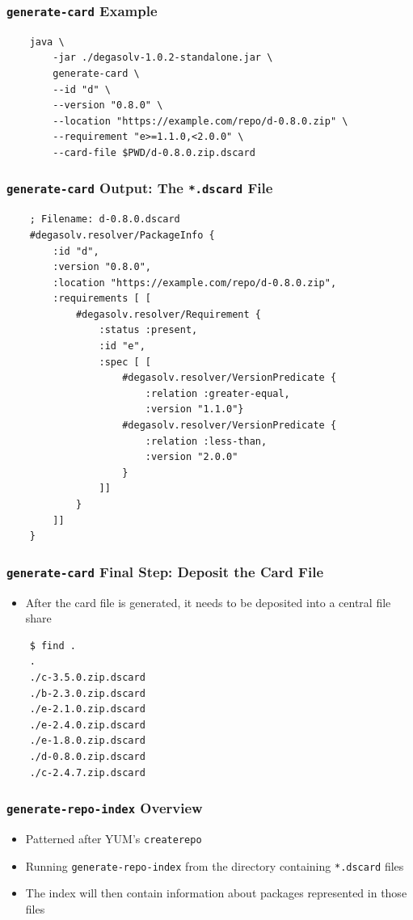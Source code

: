 \documentclass{beamer}
\begin{document}
\begin{frame}[fragile]
  \frametitle{\texttt{generate-card} Example}
\begin{verbatim}
    java \
        -jar ./degasolv-1.0.2-standalone.jar \
        generate-card \
        --id "d" \
        --version "0.8.0" \
        --location "https://example.com/repo/d-0.8.0.zip" \
        --requirement "e>=1.1.0,<2.0.0" \
        --card-file $PWD/d-0.8.0.zip.dscard
\end{verbatim}
\end{frame}
\begin{frame}[fragile]
  \frametitle{\texttt{generate-card} Output: The \texttt{*.dscard} File}
\begin{verbatim}
    ; Filename: d-0.8.0.dscard
    #degasolv.resolver/PackageInfo {
        :id "d",
        :version "0.8.0",
        :location "https://example.com/repo/d-0.8.0.zip",
        :requirements [ [
            #degasolv.resolver/Requirement {
                :status :present,
                :id "e",
                :spec [ [
                    #degasolv.resolver/VersionPredicate {
                        :relation :greater-equal,
                        :version "1.1.0"}
                    #degasolv.resolver/VersionPredicate {
                        :relation :less-than,
                        :version "2.0.0"
                    }
                ]]
            }
        ]]
    }
\end{verbatim}
\end{frame}
\begin{frame}[fragile]
  \frametitle{\texttt{generate-card} Final Step: Deposit the Card File}
  \begin{itemize}
  \item After the card file is generated, it needs to be deposited into a
    central file share
  \end{itemize}
\begin{verbatim}
    $ find .
    .
    ./c-3.5.0.zip.dscard
    ./b-2.3.0.zip.dscard
    ./e-2.1.0.zip.dscard
    ./e-2.4.0.zip.dscard
    ./e-1.8.0.zip.dscard
    ./d-0.8.0.zip.dscard
    ./c-2.4.7.zip.dscard
\end{verbatim}
\end{frame}
\begin{frame}
  \frametitle{\texttt{generate-repo-index} Overview}
  \begin{itemize}
  \item Patterned after YUM's \texttt{createrepo}
  \item Running \texttt{generate-repo-index} from the directory containing \texttt{*.dscard}
    files
  \item The index will then contain information about packages represented in those
    files
  \end{itemize}
\end{frame}
\end{document}
